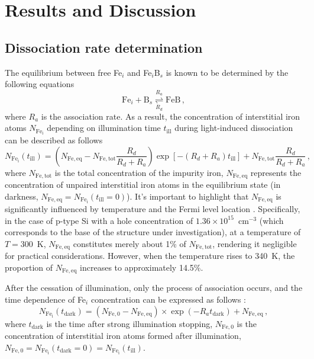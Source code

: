 \documentclass{WileyMSP-template}
\begin{document}
\section{Results and Discussion}

\subsection{Dissociation rate determination}\label{SecR}

The equilibrium between free Fe$_i$ and Fe$_i$B$_s$ is known to be determined by the following equations \cite{FeB:kinetic,Sun2021,FeBAssJAP2014}
\begin{equation}
\label{eqReac}
\mathrm{Fe}_i+\mathrm{B}_s  \overset{R_a}{\underset{R_d}{\rightleftharpoons{}}} \mathrm{FeB}\,,
\end{equation}
where
$R_a$ is the association rate.
As a result, the concentration of interstitial iron atoms $N_\mathrm{Fe_i}$ depending on illumination time $t_\mathrm{ill}$
during light-induced dissociation can be described as follows \cite{FeBLight2,FeBKin2019,Olikh2021JAP}
\begin{equation}
\label{eqNfeill}
N_\mathrm{Fe_i}(t_\mathrm{ill})=\left(N_\mathrm{Fe,eq}-N_\mathrm{Fe,tot}
\frac{R_d}{R_d+R_a}\right)\exp[-(R_d+R_a)t_\mathrm{ill}]+N_\mathrm{Fe,tot}\frac{R_d}{R_d+R_a}\,,
\end{equation}
where
$N_\mathrm{Fe,tot}$ is the total concentration of the impurity iron,
$N_\mathrm{Fe,eq}$ represents the concentration of unpaired interstitial iron atoms in the equilibrium state
(in darkness, $N_\mathrm{Fe,eq}=N_\mathrm{Fe_i}(t_\mathrm{ill}=0)$).
It's important to highlight that $N_\mathrm{Fe,eq}$ is significantly influenced
by temperature and the Fermi level location \cite{FeB:kinetic}.
Specifically, in the case of p-type Si with a hole concentration of $1.36\times10^{15}$~cm$^{-3}$
(which corresponds to the base of the structure under investigation),
at a temperature of $T=300$~K, $N_\mathrm{Fe,eq}$ constitutes merely about 1\% of $N_\mathrm{Fe,tot}$,
rendering it negligible for practical considerations.
However, when the temperature rises to 340~K, the proportion of $N_\mathrm{Fe,eq}$ increases to approximately 14.5\%.

After the cessation of illumination, only the process of association occurs,
and the time dependence of Fe$_i$ concentration can be expressed as follows \cite{FeB:kinetic,MurphyJAP2011}:
\begin{equation}
\label{eqNFet}
N_\mathrm{Fe_i}(t_\mathrm{dark})=(N_\mathrm{Fe,0}-N_\mathrm{Fe,eq})\times
\exp(-R_a t_\mathrm{dark})+N_\mathrm{Fe,eq}\,,
\end{equation}
where $t_\mathrm{dark}$ is the time after strong illumination stopping,
$N_\mathrm{Fe,0}$ is the concentration of interstitial iron atoms formed after illumination,
$N_\mathrm{Fe,0}=N_\mathrm{Fe_i}(t_\mathrm{dark}=0)=N_\mathrm{Fe_i}(t_\mathrm{ill})$.
\end{document}
